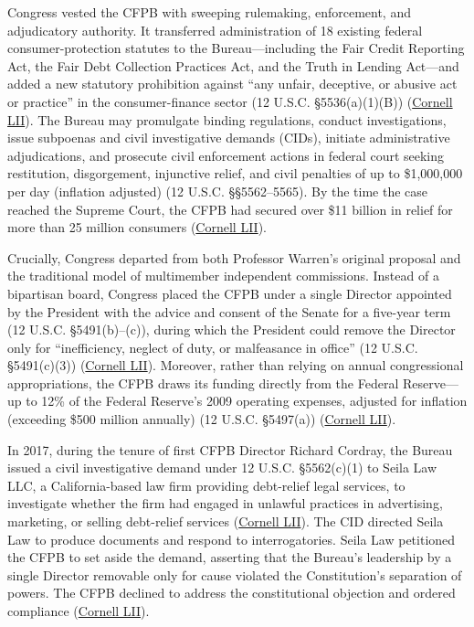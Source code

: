 \documentclass[12pt]{article}
\begin{document}
Congress vested the CFPB with sweeping rulemaking, enforcement, and adjudicatory authority. It transferred administration of 18 existing federal consumer-protection statutes to the Bureau---including the Fair Credit Reporting Act, the Fair Debt Collection Practices Act, and the Truth in Lending Act---and added a new statutory prohibition against ``any unfair, deceptive, or abusive act or practice'' in the consumer-finance sector (12 U.S.C. \S 5536(a)(1)(B)) (\href{https://www.law.cornell.edu/supremecourt/text/19-7}{Cornell LII}). The Bureau may promulgate binding regulations, conduct investigations, issue subpoenas and civil investigative demands (CIDs), initiate administrative adjudications, and prosecute civil enforcement actions in federal court seeking restitution, disgorgement, injunctive relief, and civil penalties of up to \$1,000,000 per day (inflation adjusted) (12 U.S.C. \S\S 5562--5565). By the time the case reached the Supreme Court, the CFPB had secured over \$11 billion in relief for more than 25 million consumers (\href{https://www.law.cornell.edu/supremecourt/text/19-7}{Cornell LII}).

Crucially, Congress departed from both Professor Warren's original proposal and the traditional model of multimember independent commissions. Instead of a bipartisan board, Congress placed the CFPB under a single Director appointed by the President with the advice and consent of the Senate for a five-year term (12 U.S.C. \S 5491(b)--(c)), during which the President could remove the Director only for ``inefficiency, neglect of duty, or malfeasance in office'' (12 U.S.C. \S 5491(c)(3)) (\href{https://www.law.cornell.edu/supremecourt/text/19-7}{Cornell LII}). Moreover, rather than relying on annual congressional appropriations, the CFPB draws its funding directly from the Federal Reserve---up to 12\% of the Federal Reserve's 2009 operating expenses, adjusted for inflation (exceeding \$500 million annually) (12 U.S.C. \S 5497(a)) (\href{https://www.law.cornell.edu/supremecourt/text/19-7}{Cornell LII}).

In 2017, during the tenure of first CFPB Director Richard Cordray, the Bureau issued a civil investigative demand under 12 U.S.C. \S 5562(c)(1) to Seila Law LLC, a California-based law firm providing debt-relief legal services, to investigate whether the firm had engaged in unlawful practices in advertising, marketing, or selling debt-relief services (\href{https://www.law.cornell.edu/supremecourt/text/19-7}{Cornell LII}). The CID directed Seila Law to produce documents and respond to interrogatories. Seila Law petitioned the CFPB to set aside the demand, asserting that the Bureau's leadership by a single Director removable only for cause violated the Constitution's separation of powers. The CFPB declined to address the constitutional objection and ordered compliance (\href{https://www.law.cornell.edu/supremecourt/text/19-7}{Cornell LII}).
\end{document}
